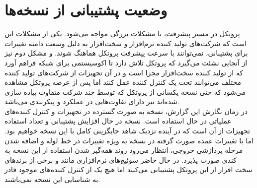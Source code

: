 \section{وضعیت پشتیبانی از نسخه‌ها}
پروتکل  در مسیر پیشرفت، با مشکلات بزرگی مواجه می‌شود. یکی از مشکلات این است که شرکت‌های تولید کننده نرم‌افزار و سخت‌افزار به دلیل وسعت دامنه تغییرات برای پشتیبانی، نمی‌توانند با سرعت پیشرفت پروتکل هماهنگ شوند. و مشکل دوم نیز از آنجایی نشئت می‌گیرد که پروتکل  تلاش دارد تا اکوسیستمی برای شبکه فراهم آورد که از تولید کننده سخت‌افزار مجزا است و در آن تجهیزات از شرکت‌های تولید کننده مختلف می‌توانند تحت یک کنترل کننده عمل کنند اما پس از عرضه پروتکل مشاهده می‌شود که حتی نسخه یکسانی از پروتکل که توسط چند شرکت متفاوت پیاده سازی شده‌اند نیز دارای تفاوت‌هایی در عملکرد و پیکربندی می‌باشد.\\
در زمان نگارش این گزارش، نسخه  به صورت گسترده در تجهیزات و کنترل کننده‌های عملیاتی در حال استفاده است. نسخه  در حال افزایش پشتیبانی و تعداد استفاده تجهیزات از آن است که در آینده نزدیک شاهد جایگزینی کامل  با این نسخه خواهیم بود. اما با تغییرات عمده صورت گرفته در نسخه  به ویژه تغییرات در خط لوله و اضافه شدن مرحله پردازشی خروجی، انتظار می‌رود روند همه‌گیر شدن استفاده از این نسخه به کندی صورت پذیرد. در حال حاضر سوئیچ‌های نرم‌افزاری مانند  و برخی از برند‌های سخت افزار از این پروتکل پشتیبانی می‌کنند اما هیچ یک از کنترل کننده‌های موجود قادر به شناسایی این نسخه نمی‌باشند.


